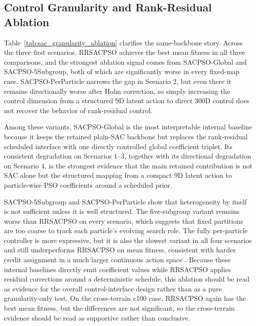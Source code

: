 \documentclass[final,5p,times]{elsarticle}
\begin{document}
\subsection{Control Granularity and Rank-Residual Ablation}
Table~\ref{tab:sac_granularity_ablation} clarifies the same-backbone story.
Across the three first scenarios, RRSACPSO achieves the best mean fitness in all three comparisons, and the strongest ablation signal comes from SACPSO-Global and SACPSO-5Subgroup, both of which are significantly worse in every fixed-map case.
SACPSO-PerParticle narrows the gap in Scenario 2, but even there it remains directionally worse after Holm correction, so simply increasing the control dimension from a structured 9D latent action to direct 300D control does not recover the behavior of rank-residual control.

Among these variants, SACPSO-Global is the most interpretable internal baseline because it keeps the retained plain-SAC backbone but replaces the rank-residual scheduled interface with one directly controlled global coefficient triplet.
Its consistent degradation on Scenarios 1--3, together with its directional degradation on Scenario 4, is the strongest evidence that the main retained contribution is not SAC alone but the structured mapping from a compact 9D latent action to particle-wise PSO coefficients around a scheduled prior.

SACPSO-5Subgroup and SACPSO-PerParticle show that heterogeneity by itself is not sufficient unless it is well structured.
The five-subgroup variant remains worse than RRSACPSO on every scenario, which suggests that fixed partitions are too coarse to track each particle's evolving search role.
The fully per-particle controller is more expressive, but it is also the slowest variant in all four scenarios and still underperforms RRSACPSO on mean fitness, consistent with harder credit assignment in a much larger continuous action space \cite{DulacArnold2015Deep, Zhou2020PLAS}.
Because these internal baselines directly emit coefficient values while RRSACPSO applies residual corrections around a deterministic schedule, this ablation should be read as evidence for the overall control-interface design rather than as a pure granularity-only test.
On the cross-terrain c100 case, RRSACPSO again has the best mean fitness, but the differences are not significant, so the cross-terrain evidence should be read as supportive rather than conclusive.
\end{document}
